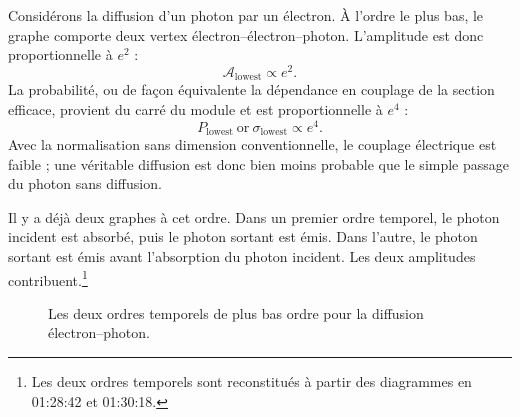 \begin{classroomqa}
\end{classroomqa}

Considérons la diffusion d’un photon par un électron. À l’ordre le plus bas, le graphe comporte deux vertex électron--électron--photon. L’amplitude est donc proportionnelle à \(e^2\) :
\begin{equation}
\mathcal{A}_{\mathrm{lowest}}\propto e^2.
\end{equation}
La probabilité, ou de façon équivalente la dépendance en couplage de la section efficace, provient du carré du module et est proportionnelle à \(e^4\) :
\begin{equation}
P_{\mathrm{lowest}}\ \text{or}\ \sigma_{\mathrm{lowest}}
\propto e^4.
\end{equation}
Avec la normalisation sans dimension conventionnelle, le couplage électrique est faible ; une véritable diffusion est donc bien moins probable que le simple passage du photon sans diffusion.

Il y a déjà deux graphes à cet ordre. Dans un premier ordre temporel, le photon incident est absorbé, puis le photon sortant est émis. Dans l’autre, le photon sortant est émis avant l’absorption du photon incident. Les deux amplitudes contribuent.\footnote{Les deux ordres temporels sont reconstitués à partir des diagrammes en 01:28:42 et 01:30:18.}

\begin{figure}[htbp]
\centering
{}
\caption{Les deux ordres temporels de plus bas ordre pour la diffusion électron--photon.}
\end{figure}

